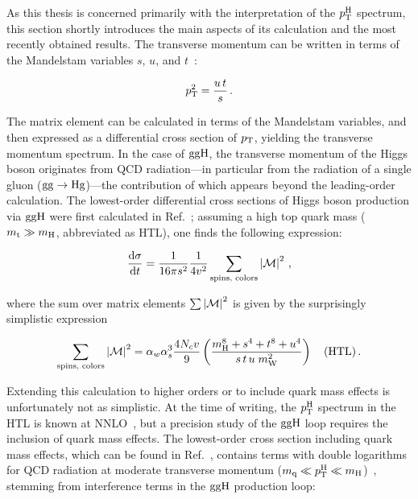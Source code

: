 As this thesis is concerned primarily with the interpretation of the $p_\mathrm{T}^\mathrm{H}$ spectrum, this section shortly introduces the main aspects of its calculation and the most recently obtained results.
% 
The transverse momentum can be written in terms of the Mandelstam variables $s$, $u$, and $t$~\cite{peskin}:
% 
\begin{linenomath*}
\begin{equation}
p_\mathrm{T}^2 = \frac{u \, t}{s}
\,.
\end{equation}
\end{linenomath*}
% 
The matrix element can be calculated in terms of the Mandelstam variables, and then expressed as a differential cross section of $p_\mathrm{T}$, yielding the transverse momentum spectrum.
% 
In the case of $\mathrm{g}\mathrm{g}\mathrm{H}$, the transverse momentum of the Higgs boson originates from QCD radiation---in particular from the radiation of a single gluon ($\mathrm{g}\mathrm{g}\to\mathrm{H}\mathrm{g}$)---the contribution of which appears beyond the leading-order calculation.
% 
The lowest-order differential cross sections of Higgs boson production via $\mathrm{g}\mathrm{g}\mathrm{H}$ were first calculated in Ref.~\cite{Ellis:1987xu}; assuming a high top quark mass ($m_{\mathrm{t}} \gg m_{\mathrm{H}}$, abbreviated as HTL), one finds the following expression:
% 
\begin{linenomath*}
\begin{equation}
\frac{\mathrm{d}\sigma}{\mathrm{d}t} =
\frac{1}{16\pi s^2} \frac{1}{4v^2}
\sum_\text{spins, colors} \left| \mathcal{M} \right |^2
\,,
\end{equation}
\end{linenomath*}
% 
where the sum over matrix elements $\sum\left| \mathcal{M} \right |^2$ is given by the surprisingly simplistic expression
% 
\begin{linenomath*}
\begin{equation}
\sum_\text{spins, colors} \abs{\mathcal{M}}^2
= \alpha_w \alpha_s^3 \frac{4 N_c v}{9} %
\left(
    \frac{\mh^8 + s^4 + t^8 + u^4}{ s \, t \, u \; m_\wboson^2 }
    \right)
\quad \text{(HTL)}
\,.
\end{equation}
\end{linenomath*}
% 
Extending this calculation to higher orders or to include quark mass effects is unfortunately not as simplistic.
% 
At the time of writing, the $p_\mathrm{T}^\mathrm{H}$ spectrum in the HTL is known at NNLO~\cite{Boughezal:2015dra,Boughezal:2015aha,Chen:2016zka}, but a precision study of the $\mathrm{g}\mathrm{g}\mathrm{H}$ loop requires the inclusion of quark mass effects.
% 
The lowest-order cross section including quark mass effects, which can be found in Ref.~\cite{Ellis:1987xu}, contains terms with double logarithms for QCD radiation at moderate transverse momentum ($m_{\mathrm{q}} \ll p_\mathrm{T}^\mathrm{H} \ll m_{\mathrm{H}}$)~\cite{Baur:1989cm,Bishara:2016jga}, stemming from interference terms in the $\mathrm{g}\mathrm{g}\mathrm{H}$ production loop:
